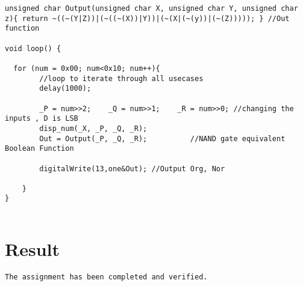 \documentclass{article}
\begin{document}
\begin{verbatim}
unsigned char Output(unsigned char X, unsigned char Y, unsigned char z){ return ~((~(Y|Z))|(~((~(X))|Y))|(~(X|(~(y))|(~(Z))))); } //Out function

void loop() {

  for (num = 0x00; num<0x10; num++){
        //loop to iterate through all usecases
        delay(1000);

        _P = num>>2;    _Q = num>>1;    _R = num>>0; //changing the inputs , D is LSB
        disp_num(_X, _P, _Q, _R);
        Out = Output(_P, _Q, _R);          //NAND gate equivalent Boolean Function

        digitalWrite(13,one&Out); //Output Org, Nor

    }
}


\end{verbatim}

\section{Result}

\begin{verbatim}
The assignment has been completed and verified.
\end{verbatim}
\end{document}
